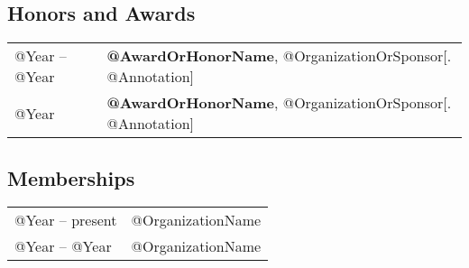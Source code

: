 \documentclass[10pt]{article}
\begin{document}
\subsection*{Honors and Awards}
\smallskip

\quad
\begin{tabular}{l@{\quad\ }l}
 @Year -- @Year
 & {\bf @AwardOrHonorName}, @OrganizationOrSponsor[. @Annotation]
 \\[.5ex]
 @Year
 & {\bf @AwardOrHonorName}, @OrganizationOrSponsor[. @Annotation]
 \\[.5ex]
\end{tabular}


\subsection*{Memberships}
\smallskip

\quad
\begin{tabular}{l@{\quad\ }l}
 @Year -- present
 & @OrganizationName
 \\[.5ex]
 @Year -- @Year
 & @OrganizationName
 \\[.5ex]
\end{tabular}
\end{document}
